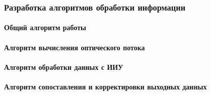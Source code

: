\subsubsection{Разработка алгоритмов обработки информации}
\paragraph{Общий алгоритм работы}
\paragraph{Алгоритм вычисления оптического потока}
\paragraph{Алгоритм обработки данных с ИИУ}
\paragraph{Алгоритм сопоставления и корректировки выходных данных}

